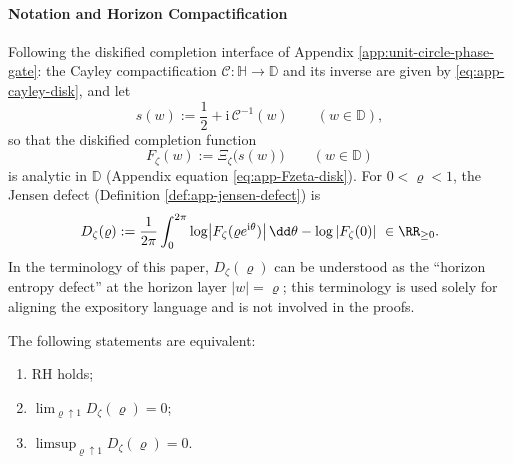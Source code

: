 \paragraph{Notation and Horizon Compactification}
Following the diskified completion interface of Appendix \ref{app:unit-circle-phase-gate}: the Cayley compactification \(\mathcal{C}:\mathbb{H}\to\mathbb{D}\) and its inverse are given by \eqref{eq:app-cayley-disk},
and let
\begin{equation}\label{eq:xi-ramanujan-horizon-s-of-w}
s(w):=\frac12+\mathrm{i}\,\mathcal{C}^{-1}(w)\qquad(w\in\mathbb{D}),
\end{equation}
so that the diskified completion function
\begin{equation}\label{eq:xi-ramanujan-horizon-Fzeta}
F_{\zeta}(w):=\Xi_{\zeta}\!\bigl(s(w)\bigr)\qquad(w\in\mathbb{D})
\end{equation}
is analytic in \(\mathbb{D}\) (Appendix equation \eqref{eq:app-Fzeta-disk}).
For \(0<\varrho<1\), the Jensen defect (Definition \ref{def:app-jensen-defect}) is
\begin{equation}\label{eq:xi-ramanujan-horizon-jensen-defect}
D_{\zeta}(\varrho)
:=\frac{1}{2\pi}\int_{0}^{2\pi}\log\bigl|F_{\zeta}(\varrho e^{\mathrm{i}\theta})\bigr|\,\dd\theta-\log|F_{\zeta}(0)|\ \in\RR_{\ge 0}.
\end{equation}
In the terminology of this paper, \(D_{\zeta}(\varrho)\) can be understood as the ``horizon entropy defect'' at the horizon layer \(|w|=\varrho\); this terminology is used solely for aligning the expository language and is not involved in the proofs.

\begin{theorem}\label{thm:xi-horizon-purity-criterion}
The following statements are equivalent:
\begin{enumerate}
  \item[(i)] RH holds;
  \item[(ii)] \(\displaystyle \lim_{\varrho\uparrow 1}D_{\zeta}(\varrho)=0\);
  \item[(iii)] \(\displaystyle \limsup_{\varrho\uparrow 1}D_{\zeta}(\varrho)=0\).
\end{enumerate}
\end{theorem}

